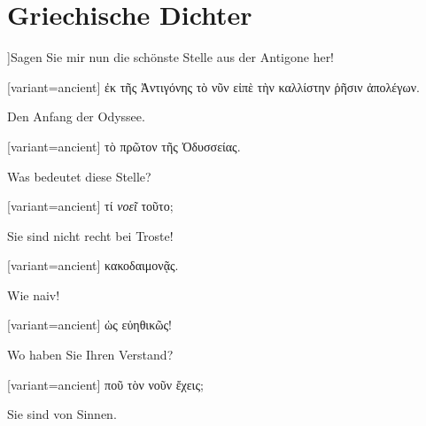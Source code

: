 \section{Griechische Dichter}

]Sagen Sie mir nun die schönste Stelle aus der Antigone her! 

\switchcolumn

\begin{greek}[variant=ancient]%
ἐκ τῆς Ἀντιγόνης τὸ νῦν εἰπὲ τὴν καλλίστην ῥῆσιν ἀπολέγων.

\end{greek}%
\switchcolumn*

Den Anfang der Odyssee. 

\switchcolumn

\begin{greek}[variant=ancient]%
τὸ πρῶτον τῆς Ὀδυσσείας.

\end{greek}%
\switchcolumn*

Was bedeutet diese Stelle? 

\switchcolumn

\begin{greek}[variant=ancient]%
τί \emph{νοεῖ} τοῦτο;

\end{greek}%
\switchcolumn*

Sie sind nicht recht bei Troste! 

\switchcolumn

\begin{greek}[variant=ancient]%
κακοδαιμονᾷς.

\end{greek}%
\switchcolumn*

Wie naiv! 

\switchcolumn

\begin{greek}[variant=ancient]%
ὡς εὐηθικῶς!

\end{greek}%
\switchcolumn*

Wo haben Sie Ihren Verstand? 

\switchcolumn

\begin{greek}[variant=ancient]%
ποῦ τὸν νοῦν ἔχεις;

\end{greek}%
\switchcolumn*

Sie sind von Sinnen. 

\switchcolumn

